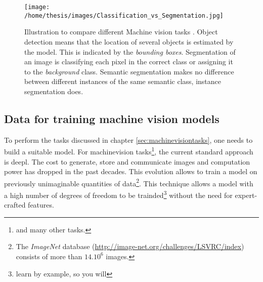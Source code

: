 \begin{SCfigure}[][h!]
    \centering
    \texttt{[image: /home/thesis/images/Classification\_vs\_Segmentation.jpg]}
    \caption{Illustration to compare different Machine vision tasks \cite{SemTorch76:online}. 
    Object detection means that the location of several objects is estimated by the model. This is indicated by the \textit{bounding boxes}.
    Segmentation of an image is classifying each pixel in the correct class or assigning it to the \textit{background} class.
    Semantic segmentation makes no difference between different instances of the same semantic class, instance segmentation does.
    \label{fig:machinevisiontasks}}
\end{SCfigure}


\subsection{Data for training machine vision models}
\par{
    To perform the tasks discussed in chapter \ref{sec:machinevisiontasks}, one needs to build a suitable model.
    For \Gls{machinevision} tasks\footnote{and many other tasks.}, the current standard approach is \Gls{deepl}.
    The cost to generate, store and communicate images and computation power has dropped in the past decades.
    This evolution allows to train a model  on previously unimaginable quantities of data\footnote{The \textit{ImageNet} database (\url{http://image-net.org/challenges/LSVRC/index}) consists of more than $14.10^6$ images.}.
    This technique allows a model with a high number of degrees of freedom to be trainded\footnote{learn by example, so you will} without the need for expert-crafted features. 
}
